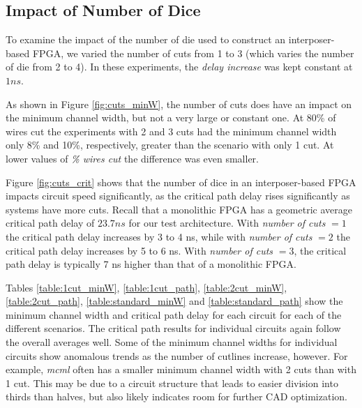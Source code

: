 \documentclass{sig-alternate-2013}
\begin{document}
\subsection{Impact of Number of Dice}

To examine the impact of the number of die used to construct an interposer-based FPGA, we varied the number of cuts from 1 to 3 (which varies the number of die from 2 to 4).  In these experiments, the \textit{delay increase} was kept constant at $1ns$. 

As shown in Figure \ref{fig:cuts_minW}, the number of cuts does have an impact on the minimum channel width, but not a very large or constant one. At 80\% of wires cut the experiments with 2 and 3 cuts had the minimum channel width only 8\% and 10\%, respectively, greater than the scenario with only 1 cut. At lower values of \textit{\% wires cut} the difference was even smaller.

Figure \ref{fig:cuts_crit} shows that the number of dice in an interposer-based FPGA impacts circuit speed significantly, as the critical path delay rises significantly as systems have more cuts. Recall that a monolithic FPGA has a geometric average critical path delay of $23.7ns$ for our test architecture. With \textit{number of cuts} $= 1$ the critical path delay increases by 3 to 4 ns, while with \textit{number of cuts} $= 2$ the critical path delay increases by 5 to 6 ns. With \textit{number of cuts} $= 3$, the critical path delay is typically 7 ns higher than that of a monolithic FPGA.

Tables \ref{table:1cut_minW}, \ref{table:1cut_path}, \ref{table:2cut_minW}, \ref{table:2cut_path}, \ref{table:standard_minW} and \ref{table:standard_path} show the minimum channel width and critical path delay for each circuit for each of the different scenarios. The critical path results for individual circuits again follow the overall averages well. Some of the minimum channel widths for individual circuits show anomalous trends as the number of cutlines increase, however. For example, \textit{mcml} often has a smaller minimum channel width with 2 cuts than with 1 cut. This may be due to a circuit structure that leads to easier division into thirds than halves, but also likely indicates room for further CAD optimization.
\end{document}
